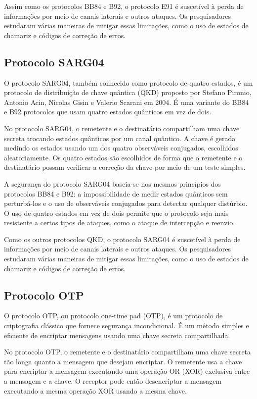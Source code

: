 Assim como os protocolos BB84 e B92, o protocolo E91 é suscetível à perda de informações por meio de canais laterais e outros ataques. Os pesquisadores estudaram várias maneiras de mitigar essas limitações, como o uso de estados de chamariz e códigos de correção de erros.

\subsection{Protocolo SARG04}

O protocolo SARG04, também conhecido como protocolo de quatro estados, é um protocolo de distribuição de chave quântica (QKD) proposto por Stefano Pironio, Antonio Acin, Nicolas Gisin e Valerio Scarani em 2004. É uma variante do BB84 e B92 protocolos que usam quatro estados quânticos em vez de dois.

No protocolo SARG04, o remetente e o destinatário compartilham uma chave secreta trocando estados quânticos por um canal quântico. A chave é gerada medindo os estados usando um dos quatro observáveis conjugados, escolhidos aleatoriamente. Os quatro estados são escolhidos de forma que o remetente e o destinatário possam verificar a correção da chave por meio de um teste simples.

A segurança do protocolo SARG04 baseia-se nos mesmos princípios dos protocolos BB84 e B92: a impossibilidade de medir estados quânticos sem perturbá-los e o uso de observáveis conjugados para detectar qualquer distúrbio. O uso de quatro estados em vez de dois permite que o protocolo seja mais resistente a certos tipos de ataques, como o ataque de intercepção e reenvio.

Como os outros protocolos QKD, o protocolo SARG04 é suscetível à perda de informações por meio de canais laterais e outros ataques. Os pesquisadores estudaram várias maneiras de mitigar essas limitações, como o uso de estados de chamariz e códigos de correção de erros.

\subsection{Protocolo OTP}

O protocolo OTP, ou protocolo one-time pad (OTP), é um protocolo de criptografia clássico que fornece segurança incondicional. É um método simples e eficiente de encriptar mensagens usando uma chave secreta compartilhada.

No protocolo OTP, o remetente e o destinatário compartilham uma chave secreta tão longa quanto a mensagem que desejam encriptar. O remetente usa a chave para encriptar a mensagem executando uma operação OR (XOR) exclusiva entre a mensagem e a chave. O receptor pode então desencriptar a mensagem executando a mesma operação XOR usando a mesma chave.

